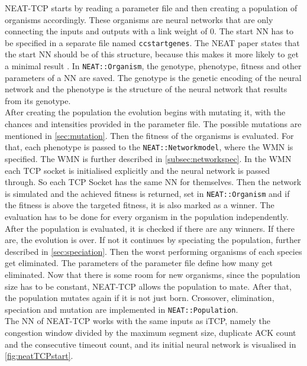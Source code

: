 NEAT-TCP starts by reading a parameter file and then creating a population of organisms accordingly. These organisms are neural networks that are only connecting the inputs and outputs with a link weight of 0. The start NN has to be specified in a separate file named \texttt{ccstartgenes}. The NEAT paper states that the start NN should be of this structure, because this makes it more likely to get a minimal result \cite{neat}. In \texttt{NEAT::Organism}, the genotype, phenotype, fitness and other parameters of a NN are saved. The genotype is the genetic encoding of the neural network and the phenotype is the structure of the neural network that results from its genotype. \\
After creating the population the evolution begins with mutating it, with the chances and intensities provided in the parameter file. The possible mutations are mentioned in \autoref{sec:mutation}. Then the fitness of the organisms is evaluated. For that, each phenotype is passed to the \texttt{NEAT::Networkmodel}, where the \gls{WMN} is specified. The WMN is further described in \autoref{subsec:networkspec}. In the WMN each TCP socket is initialised explicitly and the neural network is passed through. So each TCP Socket has the same NN for themselves. 
Then the network is simulated and the achieved fitness is returned, set in \texttt{NEAT::Organism} and if the fitness is above the targeted fitness, it is also marked as a winner. The evaluation has to be done for every organism in the population independently. \\
After the population is evaluated, it is checked if there are any winners. If there are, the evolution is over. If not it continues by speciating the population, further described in \autoref{sec:speciation}. Then the worst performing organisms of each species get eliminated. The parameters of the parameter file define how many get eliminated. Now that there is some room for new organisms, since the population size has to be constant, NEAT-TCP allows the population to mate. After that, the population mutates again if it is not just born.  Crossover, elimination, speciation and mutation are implemented in \texttt{NEAT::Population}. \\
The NN of NEAT-TCP works with the same inputs as iTCP, namely the congestion window divided by the maximum segment size, duplicate ACK count and the consecutive timeout count, and its initial neural network is visualised in \autoref{fig:neatTCPstart}.



